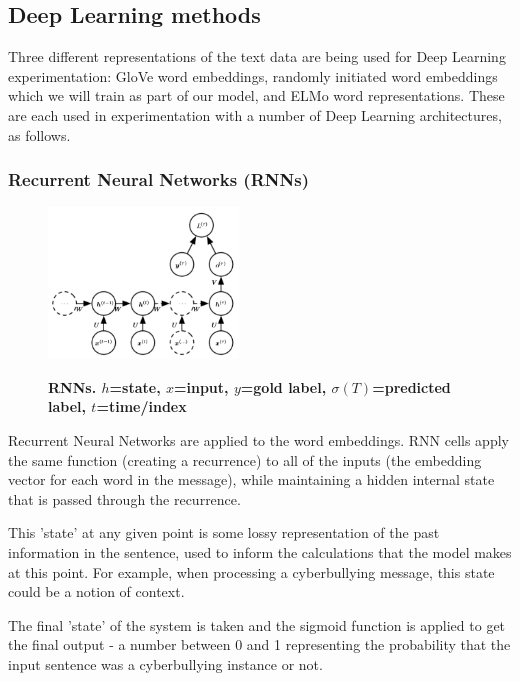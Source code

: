 \documentclass[12pt,a4paper]{article}
\begin{document}
\subsection{Deep Learning methods}
Three different representations of the text data are being used for Deep Learning experimentation: GloVe word embeddings, randomly initiated word embeddings which we will train as part of our model, and ELMo word representations. These are each used in experimentation with a number of Deep Learning architectures, as follows.

	\subsubsection{Recurrent Neural Networks (RNNs)}
	
	\begin{figure}
		\vspace{-40pt}
		\includegraphics[width=0.45\textwidth]{RNN.png}
		\vspace{-2pt}
		\label{RNN}
		\caption{\textbf{RNNs. $h$=state, $x$=input, $y$=gold label, $\sigma(T)$=predicted label, $t$=time/index}}
	\end{figure}
	
	Recurrent Neural Networks are applied to the word embeddings. RNN cells apply the same function (creating a recurrence) to all of the inputs (the embedding vector for each word in the message), while maintaining a hidden internal state that is passed through the recurrence. \cite[p.376]{DL}
	
	This 'state' at any given point is some lossy representation of the past information in the sentence, used to inform the calculations that the model makes at this point. For example, when processing a cyberbullying message, this state could be a notion of context.
	
	The final 'state' of the system is taken and the sigmoid function is applied to get the final output - a number between 0 and 1 representing the probability that the input sentence was a cyberbullying instance or not.
	
\end{document}
